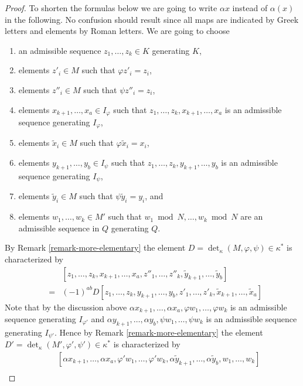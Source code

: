 \begin{proof}
\medskip\noindent
To shorten the formulas below we are going to write $\alpha x$ instead
of $\alpha(x)$ in the following. No confusion should result since
all maps are indicated by Greek letters and elements by Roman letters.
We are going to choose
\begin{enumerate}
\item an admissible sequence $z_1, \ldots, z_k \in K$
generating $K$,
\item elements $z'_i \in M$ such that $\varphi z'_i = z_i$,
\item elements $z''_i \in M$ such that $\psi z''_i = z_i$,
\item elements $x_{k + 1}, \ldots, x_a \in I_\varphi$ such
that $z_1, \ldots, z_k, x_{k + 1}, \ldots, x_a$ is an admissible
sequence generating $I_\varphi$,
\item elements $\tilde x_i \in M$ such that $\varphi \tilde x_i = x_i$,
\item elements $y_{k + 1}, \ldots, y_b \in I_\psi$ such that
$z_1, \ldots, z_k, y_{k + 1}, \ldots, y_b$ is an admissible
sequence generating $I_\psi$,
\item elements $\tilde y_i \in M$ such that $\psi \tilde y_i = y_i$, and
\item elements $w_1, \ldots, w_k \in M'$ such that
$w_1 \bmod N, \ldots, w_k \bmod N$ are an admissible sequence
in $Q$ generating $Q$.
\end{enumerate}
By Remark \ref{remark-more-elementary} the element
$D = \det_\kappa(M, \varphi, \psi) \in \kappa^*$ is
characterized by
\begin{eqnarray*}
& &
[z_1, \ldots, z_k,
x_{k + 1}, \ldots, x_a,
z''_1, \ldots, z''_k,
\tilde y_{k + 1}, \ldots, \tilde y_b] \\
& = &
(-1)^{ab} D
[z_1, \ldots, z_k,
y_{k + 1}, \ldots, y_b,
z'_1, \ldots, z'_k,
\tilde x_{k + 1}, \ldots, \tilde x_a]
\end{eqnarray*}
Note that by the discussion above
$\alpha x_{k + 1}, \ldots, \alpha x_a, \varphi w_1, \ldots, \varphi w_k$
is an admissible sequence generating $I_{\varphi'}$ and
$\alpha y_{k + 1}, \ldots, \alpha y_b, \psi w_1, \ldots, \psi w_k$
is an admissible sequence generating $I_{\psi'}$.
Hence by Remark \ref{remark-more-elementary} the element
$D' = \det_\kappa(M', \varphi', \psi') \in \kappa^*$ is
characterized by
\begin{eqnarray*}
& &
[\alpha x_{k + 1}, \ldots, \alpha x_a,
\varphi' w_1, \ldots, \varphi' w_k,
\alpha \tilde y_{k + 1}, \ldots, \alpha \tilde y_b,
w_1, \ldots, w_k]
\\

\end{eqnarray*}
\end{proof}
